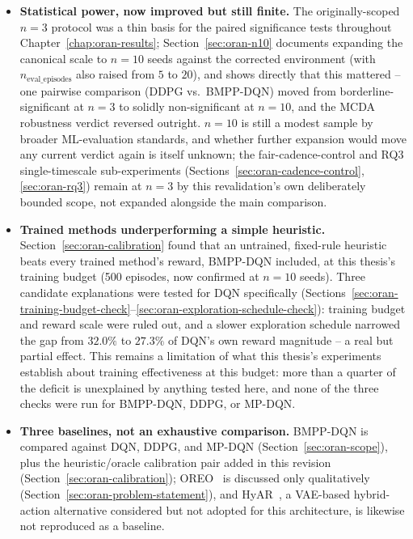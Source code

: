 \begin{itemize}
    ruled in or out; reward-weight sensitivity was not), this remains the
    most likely untested lever on the energy/QoS/switching trade-off
    reported in Chapter~\ref{chap:oran-results}.
  \item \textbf{Statistical power, now improved but still finite.} The
    originally-scoped $n=3$ protocol was a thin basis for the paired
    significance tests throughout Chapter~\ref{chap:oran-results};
    Section~\ref{sec:oran-n10} documents expanding the canonical scale to
    $n=10$ seeds against the corrected environment (with
    $n_{\text{eval\_episodes}}$ also raised from $5$ to $20$), and shows
    directly that this mattered -- one pairwise comparison (DDPG vs.\
    BMPP-DQN) moved from borderline-significant at $n=3$ to solidly
    non-significant at $n=10$, and the MCDA robustness verdict reversed
    outright. $n=10$ is still a modest sample by broader ML-evaluation
    standards, and whether further expansion would move any current
    verdict again is itself unknown; the fair-cadence-control and RQ3
    single-timescale sub-experiments (Sections~\ref{sec:oran-cadence-control},
    \ref{sec:oran-rq3}) remain at $n=3$ by this revalidation's own
    deliberately bounded scope, not expanded alongside the main
    comparison.
  \item \textbf{Trained methods underperforming a simple heuristic.}
    Section~\ref{sec:oran-calibration} found that an untrained, fixed-rule
    heuristic beats every trained method's reward, BMPP-DQN included, at
    this thesis's training budget (500 episodes, now confirmed at $n=10$
    seeds). Three candidate
    explanations were tested for DQN specifically
    (Sections~\ref{sec:oran-training-budget-check}--\ref{sec:oran-exploration-schedule-check}):
    training budget and reward scale were ruled out, and a slower
    exploration schedule narrowed the gap from $32.0\%$ to $27.3\%$ of
    DQN's own reward magnitude -- a real but partial effect. This remains
    a limitation of what this thesis's experiments establish about
    training effectiveness at this budget: more than a quarter of the
    deficit is unexplained by anything tested here, and none of the three
    checks were run for BMPP-DQN, DDPG, or MP-DQN.
  \item \textbf{Three baselines, not an exhaustive comparison.} BMPP-DQN is
    compared against DQN, DDPG, and MP-DQN
    (Section~\ref{sec:oran-scope}), plus the heuristic/oracle calibration
    pair added in this revision (Section~\ref{sec:oran-calibration});
    OREO~\cite{qazzaz2026oreo} is discussed only qualitatively
    (Section~\ref{sec:oran-problem-statement}), and HyAR~\cite{li2022hyar},
    a VAE-based hybrid-action alternative considered but not adopted for
    this architecture, is likewise not reproduced as a baseline.
\end{itemize}

